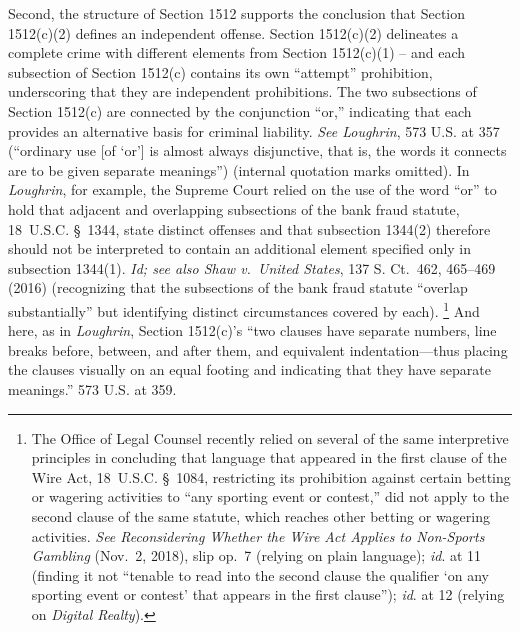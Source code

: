 Second, the structure of Section 1512 supports the conclusion that Section 1512(c)(2) defines an independent offense.
Section 1512(c)(2) delineates a complete crime with different elements from Section 1512(c)(1) -- and each subsection of Section 1512(c) contains its own ``attempt'' prohibition, underscoring that they are independent prohibitions.
The two subsections of Section 1512(c) are connected by the conjunction ``or,'' indicating that each provides an alternative basis for criminal liability.
\textit{See Loughrin}, 573 U.S. at 357 (``ordinary use [of `or'] is almost always disjunctive, that is, the words it connects are to be given separate meanings'') (internal quotation marks omitted).
In \textit{Loughrin}, for example, the Supreme Court relied on the use of the word ``or'' to hold that adjacent and overlapping subsections of the bank fraud statute, 18~U.S.C. \S~1344, state distinct offenses and that subsection 1344(2) therefore should not be interpreted to contain an additional element specified only in subsection 1344(1).
\textit{Id; see also Shaw v.\ United States}, 137 S. Ct.~462, 465--469 (2016) (recognizing that the subsections of the bank fraud statute ``overlap substantially'' but identifying distinct circumstances covered by each).%
\footnote{The Office of Legal Counsel recently relied on several of the same interpretive principles in concluding that language that appeared in the first clause of the Wire Act, 18~U.S.C. \S~1084, restricting its prohibition against certain betting or wagering activities to ``any sporting event or contest,'' did not apply to the second clause of the same statute, which reaches other betting or wagering activities.
\textit{See Reconsidering Whether the Wire Act Applies to Non-Sports Gambling} (Nov.~2, 2018), slip op.~7 (relying on plain language);
\textit{id}. at 11 (finding it not ``tenable to read into the second clause the qualifier `on any sporting event or contest' that appears in the first clause'');
\textit{id}. at 12 (relying on \textit{Digital Realty}).}
And here, as in \textit{Loughrin}, Section 1512(c)'s ``two clauses have separate numbers, line breaks before, between, and after them, and equivalent indentation---thus placing the clauses visually on an equal footing and indicating that they have separate meanings.'' 573 U.S. at 359.

